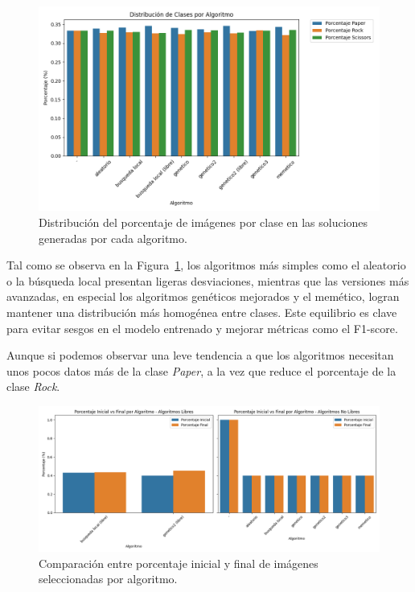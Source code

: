 \begin{figure}[htp]
    \centering
    \includegraphics[width=1\textwidth]{imagenes/mobilenet-BARPLOT-balance-de-clases-por-algoritmo}
    \caption{Distribución del porcentaje de imágenes por clase en las soluciones generadas por cada algoritmo.}
    \label{fig:balance-de-clases-por-algoritmo}
\end{figure}

Tal como se observa en la Figura~\ref{fig:balance-de-clases-por-algoritmo}, los algoritmos más simples como el aleatorio o la búsqueda local presentan ligeras desviaciones, mientras que las versiones más avanzadas, en especial los algoritmos genéticos mejorados y el memético, logran mantener una distribución más homogénea entre clases.
Este equilibrio es clave para evitar sesgos en el modelo entrenado y mejorar métricas como el F1-score.


Aunque si podemos observar una leve tendencia a que los algoritmos necesitan unos pocos datos más de la clase \textit{Paper}, a la vez que reduce el porcentaje de la clase \textit{Rock}.


\begin{figure}[htp]
    \centering
    \includegraphics[width=1\textwidth]{imagenes/mobilenet-BARPLOT-porcentaje-inical-vs-final-por-algoritmo}
    \caption{Comparación entre porcentaje inicial y final de imágenes seleccionadas por algoritmo.
    }
    \label{fig:comparation-initial-final}
\end{figure}

